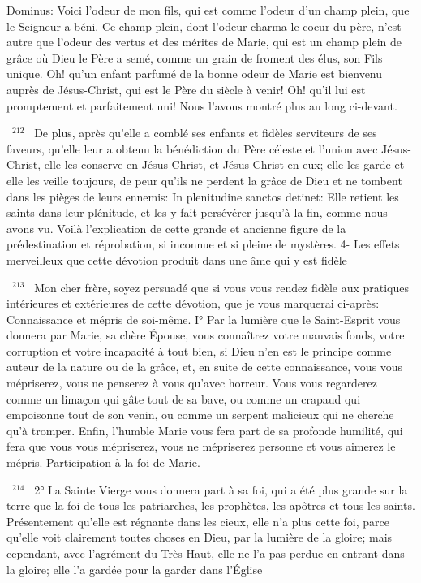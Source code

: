 \documentclass[paper=a5,pagesize=pdftex,fontsize=15pt,headinclude=on,twoside=off]{scrbook}
\newcommand{\negphantom}[1]{\settowidth{\dimen0}{#1}\hspace*{-\dimen0}}
\newcommand{\versenb}[1]{\par \vspace{10pt}~\negphantom{~${}^{#1}$~}${}^{#1}$~}
\begin{document}
Dominus: Voici l'odeur de mon fils, qui est comme l'odeur d'un champ plein, que le Seigneur a béni. Ce champ
plein, dont l'odeur charma le coeur du père, n'est autre que l'odeur des vertus et des mérites de Marie, qui est un
champ plein de grâce où Dieu le Père a semé, comme un grain de froment des élus, son Fils unique. Oh! qu'un
enfant parfumé de la bonne odeur de Marie est bienvenu auprès de Jésus-Christ, qui est le Père du siècle à venir!
Oh! qu'il lui est promptement et parfaitement uni! Nous l'avons montré plus au long ci-devant.
\versenb{212} De plus, après qu'elle a comblé ses enfants et fidèles serviteurs de ses faveurs, qu'elle leur a obtenu la
bénédiction du Père céleste et l'union avec Jésus-Christ, elle les conserve en Jésus-Christ, et Jésus-Christ en eux;
elle les garde et elle les veille toujours, de peur qu'ils ne perdent la grâce de Dieu et ne tombent dans les pièges
de leurs ennemis: In plenitudine sanctos detinet: Elle retient les saints dans leur plénitude, et les y fait persévérer
jusqu'à la fin, comme nous avons vu.
Voilà l'explication de cette grande et ancienne figure de la prédestination et réprobation, si inconnue et si pleine de
mystères.
4- Les effets merveilleux que cette dévotion produit
dans une âme qui y est fidèle
\versenb{213} Mon cher frère, soyez persuadé que si vous vous rendez fidèle aux pratiques intérieures et extérieures de
cette dévotion, que je vous marquerai ci-après:
Connaissance et mépris de soi-même.
I° Par la lumière que le Saint-Esprit vous donnera par Marie, sa chère Épouse, vous connaîtrez votre mauvais
fonds, votre corruption et votre incapacité à tout bien, si Dieu n'en est le principe comme auteur de la nature ou de
la grâce, et, en suite de cette connaissance, vous vous mépriserez, vous ne penserez à vous qu'avec horreur.
Vous vous regarderez comme un limaçon qui gâte tout de sa bave, ou comme un crapaud qui empoisonne tout de
son venin, ou comme un serpent malicieux qui ne cherche qu'à tromper. Enfin, l'humble Marie vous fera part de sa
profonde humilité, qui fera que vous vous mépriserez, vous ne mépriserez personne et vous aimerez le mépris.
Participation à la foi de Marie.
\versenb{214} 2° La Sainte Vierge vous donnera part à sa foi, qui a été plus grande sur la terre que la foi de tous les
patriarches, les prophètes, les apôtres et tous les saints. Présentement qu'elle est régnante dans les cieux, elle n'a
plus cette foi, parce qu'elle voit clairement toutes choses en Dieu, par la lumière de la gloire; mais cependant, avec
l'agrément du Très-Haut, elle ne l'a pas perdue en entrant dans la gloire; elle l'a gardée pour la garder dans l'Église
\end{document}
